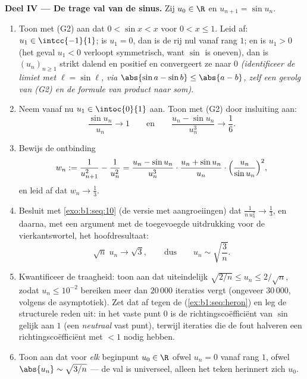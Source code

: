 \begin{problem}[{Weekendopgave --- de stelling van Cesàro--Stolz en de
asymptotiek $u_n \sim \sqrt{3/n}$ voor $u_{n+1} = \sin u_n$}]
\medskip
\noindent\textbf{Deel IV --- De trage val van de sinus.} Zij $u_0 \in \R$
en $u_{n+1} = \sin u_n$.
\begin{enumerate}[resume]
  \item Toon met (G2) aan dat $0 < \sin x < x$ voor $0 < x \leq 1$. Leid
        af: $u_1 \in \intcc{-1}{1}$; is $u_1 = 0$, dan is de rij nul
        vanaf rang $1$; en is $u_1 > 0$ (het geval $u_1 < 0$ verloopt
        symmetrisch, want $\sin$ is oneven), dan is $(u_n)_{n \geq 1}$
        strikt dalend en positief en convergeert ze naar $0$
        \emph{(identificeer de limiet met $\ell = \sin \ell$, via
        $\abs{\sin a - \sin b} \leq \abs{a - b}$, zelf een gevolg van
        (G2) en de formule van product naar som)}.
  \item Neem vanaf nu $u_1 \in \intoc{0}{1}$ aan. Toon met (G2) door
        insluiting aan:
        \[
        \frac{\sin u_n}{u_n} \to 1
        \qquad\text{en}\qquad
        \frac{u_n - \sin u_n}{u_n^{3}} \to \frac16 .
        \]
  \item Bewijs de ontbinding
        \[
        w_n := \frac{1}{u_{n+1}^{2}} - \frac{1}{u_n^{2}}
        = \frac{u_n - \sin u_n}{u_n^{3}} \cdot
        \frac{u_n + \sin u_n}{u_n} \cdot
        \Bigl(\frac{u_n}{\sin u_n}\Bigr)^{2},
        \]
        en leid af dat $w_n \to \frac13$.
  \item Besluit met \cref{exo:b1:seq:10} (de versie met aangroeiingen)
        dat $\frac{1}{n\,u_n^{2}} \to \frac13$, en daarna, met een
        argument met de toegevoegde uitdrukking voor de vierkantswortel,
        het hoofdresultaat:
        \[
        \sqrt n\;u_n \longrightarrow \sqrt 3 ,
        \qquad\text{dus}\qquad
        u_n \sim \sqrt{\frac 3n} .
        \]
  \item Kwantificeer de traagheid: toon aan dat uiteindelijk
        $\sqrt{2/n} \leq u_n \leq 2/\sqrt n$, zodat $u_n \leq 10^{-2}$
        bereiken meer dan $20\,000$ iteraties vergt (ongeveer
        $30\,000$, volgens de asymptotiek). Zet dat af tegen de  (\cref{ex:b1:seq:heron}) en leg de structurele reden
        uit: in het vaste punt $0$ is de richtingscoëfficiënt van $\sin$
        gelijk aan $1$ (een \emph{neutraal} vast punt), terwijl
        iteraties die de fout halveren een richtingscoëfficiënt met
         $< 1$ nodig hebben.
  \item Toon aan dat voor \emph{elk} beginpunt $u_0 \in \R$ ofwel $u_n =
        0$ vanaf rang $1$, ofwel $\abs{u_n} \sim \sqrt{3/n}$ --- de val
        is universeel, alleen het teken herinnert zich $u_0$.
\end{enumerate}


\end{problem}
